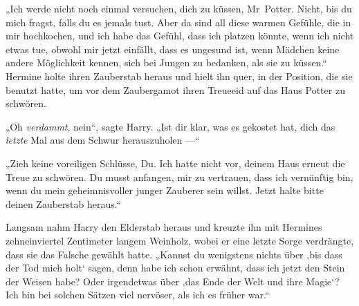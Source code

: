 „Ich werde nicht noch einmal versuchen, dich zu küssen, Mr~Potter. Nicht, bis du mich fragst, falls du es jemals tust. Aber da sind all diese warmen Gefühle, die in mir hochkochen, und ich habe das Gefühl, dass ich platzen könnte, wenn ich nicht etwas tue, obwohl mir jetzt einfällt, dass es ungesund ist, wenn Mädchen keine andere Möglichkeit kennen, sich bei Jungen zu bedanken, als sie zu küssen.“
Hermine holte ihren Zauberstab heraus und hielt ihn quer, in der Position, die sie benutzt hatte, um vor dem Zaubergamot ihren Treueeid auf das Haus Potter zu schwören.

„Oh \emph{verdammt}, nein“, sagte Harry.
„Ist dir klar, was es gekostet hat, dich das \emph{letzte} Mal aus dem Schwur herauszuholen —“

„Zieh keine voreiligen Schlüsse, Du. Ich hatte nicht vor, deinem Haus erneut die Treue zu schwören. Du musst anfangen, mir zu vertrauen, dass ich vernünftig bin, wenn du mein geheimnisvoller junger Zauberer sein willst. Jetzt halte bitte deinen Zauberstab heraus.“

Langsam nahm Harry den Elderstab heraus und kreuzte ihn mit Hermines zehneinviertel Zentimeter langem Weinholz, wobei er eine letzte Sorge verdrängte, dass sie das Falsche gewählt hatte.
„Kannst du wenigstens nichts über ‚bis dass der Tod mich holt‘ sagen, denn habe ich schon erwähnt, dass ich jetzt den Stein der Weisen habe? Oder irgendetwas über ‚das Ende der Welt und ihre Magie‘? Ich bin bei solchen Sätzen viel nervöser, als ich es früher war.“

